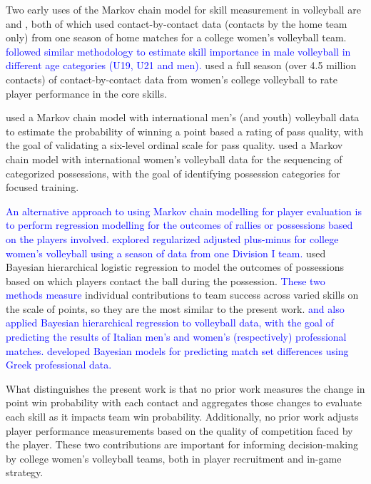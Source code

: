 \documentclass[USenglish]{article}
\theoremstyle{dgthm}
\theoremstyle{dgdef}
\begin{document}
Two early uses of the Markov chain model for skill measurement in volleyball are \textcite{florence_etal_2008} and \textcite{miskin_etal_2010}, both of which used contact-by-contact data (contacts by the home team only) from one season of home matches for a college women's volleyball team. \textcolor{blue}{\textcite{drikos_etal_2019} followed similar methodology to estimate skill importance in male volleyball in different age categories (U19, U21 and men).} \textcite{bagley_ware_2017} used a full season (over 4.5 million contacts) of contact-by-contact data from women's college volleyball to rate player performance in the core skills.

\textcite{drikos_2018} used a Markov chain model with international men's (and youth) volleyball data to estimate the probability of winning a point based a rating of pass quality, with the goal of validating a six-level ordinal scale for pass quality. \textcite{hileno_etal_2020} used a Markov chain model with international women's volleyball data for the sequencing of categorized possessions, with the goal of identifying possession categories for focused training.

\textcolor{blue}{An alternative approach to using Markov chain modelling for player evaluation is to perform regression modelling for the outcomes of rallies or possessions based on the players involved. \textcite{hass_craig_2018} explored regularized adjusted plus-minus for college women's volleyball using a season of data from one Division I team.} \textcite{fellingham_2022} used Bayesian hierarchical logistic regression to model the outcomes of possessions based on which players contact the ball during the possession. \textcolor{blue}{These two methods measure} individual contributions to team success across varied skills on the scale of points, so they are the most similar to the present work. \textcolor{blue}{\textcite{egidi_ntzoufras_2020} and \textcite{gabrio_2021} also applied Bayesian hierarchical regression to volleyball data, with the goal of predicting the results of Italian men's and women's (respectively) professional matches.  \textcite{ntzoufras_etal_2021} developed Bayesian models for predicting match set differences using Greek professional data.}

What distinguishes the present work is that no prior work measures the change in point win probability with each contact and aggregates those changes to evaluate each skill as it impacts team win probability. Additionally, no prior work adjusts player performance measurements based on the quality of competition faced by the player. These two contributions are important for informing decision-making by college women's volleyball teams, both in player recruitment and in-game strategy.
\end{document}
